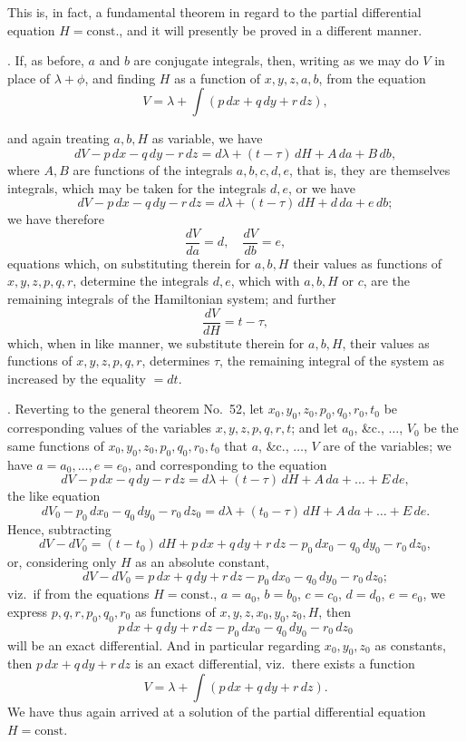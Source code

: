 \documentclass[11pt,a4paper]{article}
\begin{document}
This is, in fact, a fundamental theorem in regard to the partial differential equation $H = \text{const.}$, and it will presently be proved in a different manner.

\medskip

. If, as before, $a$ and $b$ are conjugate integrals, then, writing as we may do $V$ in place of $\lambda + \phi$, and finding $H$ as a function of $x, y, z, a, b$, from the equation
\[
V = \lambda + \int (p\,dx + q\,dy + r\,dz),
\]

\newpage


and again treating $a, b, H$ as variable, we have
\[
dV - p\,dx - q\,dy - r\,dz = d\lambda + (t - \tau)\,dH + A\,da + B\,db,
\]
where $A, B$ are functions of the integrals $a, b, c, d, e$, that is, they are themselves integrals, which may be taken for the integrals $d, e$, or we have
\[
dV - p\,dx - q\,dy - r\,dz = d\lambda + (t - \tau)\,dH + d\,da + e\,db;
\]
we have therefore
\[
\frac{dV}{da} = d, \quad \frac{dV}{db} = e,
\]
equations which, on substituting therein for $a, b, H$ their values as functions of $x, y, z, p, q, r$, determine the integrals $d, e$, which with $a, b, H$ or $c$, are the remaining integrals of the Hamiltonian system; and further
\[
\frac{dV}{dH} = t - \tau,
\]
which, when in like manner, we substitute therein for $a, b, H$, their values as functions of $x, y, z, p, q, r$, determines $\tau$, the remaining integral of the system as increased by the equality $= dt$.

\medskip

. Reverting to the general theorem No.\ 52, let $x_{0}, y_{0}, z_{0}, p_{0}, q_{0}, r_{0}, t_{0}$ be corresponding values of the variables $x, y, z, p, q, r, t$; and let $a_{0}$, \&c., $\ldots$, $V_{0}$ be the same functions of $x_{0}, y_{0}, z_{0}, p_{0}, q_{0}, r_{0}, t_{0}$ that $a$, \&c., $\ldots$, $V$ are of the variables; we have $a = a_{0}, \ldots, e = e_{0}$, and corresponding to the equation
\[
dV - p\,dx - q\,dy - r\,dz = d\lambda + (t - \tau)\,dH + A\,da + \ldots + E\,de,
\]
the like equation
\[
dV_{0} - p_{0}\,dx_{0} - q_{0}\,dy_{0} - r_{0}\,dz_{0} = d\lambda + (t_{0} - \tau)\,dH + A\,da + \ldots + E\,de.
\]
Hence, subtracting
\[
dV - dV_{0} = (t - t_{0})\,dH + p\,dx + q\,dy + r\,dz - p_{0}\,dx_{0} - q_{0}\,dy_{0} - r_{0}\,dz_{0},
\]
or, considering only $H$ as an absolute constant,
\[
dV - dV_{0} = p\,dx + q\,dy + r\,dz - p_{0}\,dx_{0} - q_{0}\,dy_{0} - r_{0}\,dz_{0};
\]
viz.\ if from the equations $H = \text{const.}$, $a = a_{0}$, $b = b_{0}$, $c = c_{0}$, $d = d_{0}$, $e = e_{0}$, we express $p, q, r, p_{0}, q_{0}, r_{0}$ as functions of $x, y, z, x_{0}, y_{0}, z_{0}, H$, then
\[
p\,dx + q\,dy + r\,dz - p_{0}\,dx_{0} - q_{0}\,dy_{0} - r_{0}\,dz_{0}
\]
will be an exact differential. And in particular regarding $x_{0}, y_{0}, z_{0}$ as constants, then $p\,dx + q\,dy + r\,dz$ is an exact differential, viz.\ there exists a function
\[
V = \lambda + \int (p\,dx + q\,dy + r\,dz).
\]
We have thus again arrived at a solution of the partial differential equation $H = \text{const.}$
\end{document}
